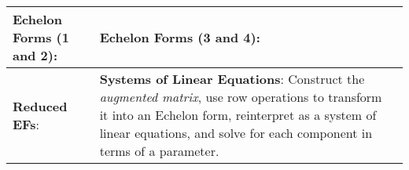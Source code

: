 \begin{tabular}{|m{.31\linewidth}|m{.31\linewidth}|m{.31\linewidth}|}
\textbf{Echelon Forms (1 and 2)}:
    \smash{$
        \begin{pmatrix}
            \star & \square & \square \\
            0 & \star & \square \\
            0 & 0 & \star
        \end{pmatrix}
        \begin{pmatrix}
            \star & \square & \square \\
            0 & \star & \square \\
            0 & 0 & 0
        \end{pmatrix}
    $} &

\textbf{Echelon Forms (3 and 4)}:
    \smash{$
        \begin{pmatrix}
            \star & \square & \square \\
            0 & 0 & \star \\
            0 & 0 & 0
        \end{pmatrix}
        \begin{pmatrix}
            \star & \square & \square \\
            0 & 0 & 0 \\
            0 & 0 & 0
        \end{pmatrix}
    $} \\

\hline

\textbf{Reduced EFs}:
    \smash{$
        \begin{pmatrix}
            \star & 0 & 0 \\
            0 & \star & 0 \\
            0 & 0 & \star
        \end{pmatrix}
        \begin{pmatrix}
            \star & 0 & \square \\
            0 & \star & \square \\
            0 & 0 & \star
        \end{pmatrix}
        \begin{pmatrix}
            \star & \square & 0 \\
            0 & 0 & \star \\
            0 & 0 & 0
        \end{pmatrix}
    $} &

\textbf{Systems of Linear Equations}:
    Construct the \emph{augmented matrix}, use row operations to transform it
    into an Echelon form, reinterpret as a system of linear equations, and solve
    for each component in terms of a parameter. &


\end{tabular}
